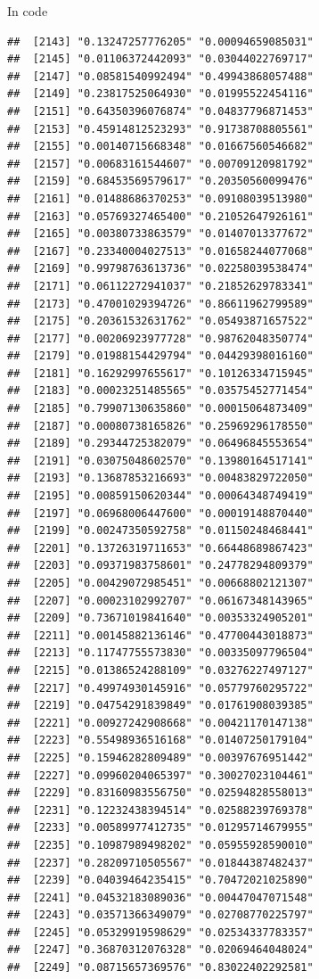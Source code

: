 \documentclass[ignorenonframetext,]{beamer}
\begin{document}
\begin{frame}[fragile]{In code}
\begin{verbatim}
##  [2143] "0.13247257776205" "0.00094659085031"
##  [2145] "0.01106372442093" "0.03044022769717"
##  [2147] "0.08581540992494" "0.49943868057488"
##  [2149] "0.23817525064930" "0.01995522454116"
##  [2151] "0.64350396076874" "0.04837796871453"
##  [2153] "0.45914812523293" "0.91738708805561"
##  [2155] "0.00140715668348" "0.01667560546682"
##  [2157] "0.00683161544607" "0.00709120981792"
##  [2159] "0.68453569579617" "0.20350560099476"
##  [2161] "0.01488686370253" "0.09108039513980"
##  [2163] "0.05769327465400" "0.21052647926161"
##  [2165] "0.00380733863579" "0.01407013377672"
##  [2167] "0.23340004027513" "0.01658244077068"
##  [2169] "0.99798763613736" "0.02258039538474"
##  [2171] "0.06112272941037" "0.21852629783341"
##  [2173] "0.47001029394726" "0.86611962799589"
##  [2175] "0.20361532631762" "0.05493871657522"
##  [2177] "0.00206923977728" "0.98762048350774"
##  [2179] "0.01988154429794" "0.04429398016160"
##  [2181] "0.16292997655617" "0.10126334715945"
##  [2183] "0.00023251485565" "0.03575452771454"
##  [2185] "0.79907130635860" "0.00015064873409"
##  [2187] "0.00080738165826" "0.25969296178550"
##  [2189] "0.29344725382079" "0.06496845553654"
##  [2191] "0.03075048602570" "0.13980164517141"
##  [2193] "0.13687853216693" "0.00483829722050"
##  [2195] "0.00859150620344" "0.00064348749419"
##  [2197] "0.06968006447600" "0.00019148870440"
##  [2199] "0.00247350592758" "0.01150248468441"
##  [2201] "0.13726319711653" "0.66448689867423"
##  [2203] "0.09371983758601" "0.24778294809379"
##  [2205] "0.00429072985451" "0.00668802121307"
##  [2207] "0.00023102992707" "0.06167348143965"
##  [2209] "0.73671019841640" "0.00353324905201"
##  [2211] "0.00145882136146" "0.47700443018873"
##  [2213] "0.11747755573830" "0.00335097796504"
##  [2215] "0.01386524288109" "0.03276227497127"
##  [2217] "0.49974930145916" "0.05779760295722"
##  [2219] "0.04754291839849" "0.01761908039385"
##  [2221] "0.00927242908668" "0.00421170147138"
##  [2223] "0.55498936516168" "0.01407250179104"
##  [2225] "0.15946282809489" "0.00397676951442"
##  [2227] "0.09960204065397" "0.30027023104461"
##  [2229] "0.83160983556750" "0.02594828558013"
##  [2231] "0.12232438394514" "0.02588239769378"
##  [2233] "0.00589977412735" "0.01295714679955"
##  [2235] "0.10987989498202" "0.05955928590010"
##  [2237] "0.28209710505567" "0.01844387482437"
##  [2239] "0.04039464235415" "0.70472021025890"
##  [2241] "0.04532183089036" "0.00447047071548"
##  [2243] "0.03571366349079" "0.02708770225797"
##  [2245] "0.05329919598629" "0.02534337783357"
##  [2247] "0.36870312076328" "0.02069464048024"
##  [2249] "0.08715657369576" "0.83022402292581"

\end{verbatim}
\end{frame}
\end{document}
